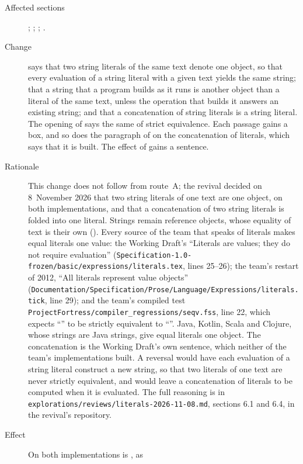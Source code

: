 \begin{description}
\item[Affected sections] ; ;
; .
\item[Change]  says that two string literals of the same text
denote one object, so that every evaluation of a string literal with a given
text yields the same string; that a string that a program builds as it runs is
another object than a literal of the same text, unless the operation that builds
it answers an existing string; and that a concatenation of string literals is a
string literal.
The opening of  says the same of strict equivalence.
Each passage gains a box, and so does the paragraph of  on
the concatenation of literals, which says that it is built.
The effect of  gains a sentence.
\item[Rationale] This change does not follow from route~A; the revival decided
on 8~November 2026 that two string literals of one text are one object, on both
implementations, and that a concatenation of two string literals is folded into
one literal.
Strings remain reference objects, whose equality of text is their own \EXP{=}
().
Every source of the team that speaks of literals makes equal literals one value:
the Working Draft's ``Literals are values; they do not require evaluation''
(\nolinkurl{Specification-1.0-frozen/basic/expressions/literals.tex}, lines
25--26); the team's restart of 2012, ``All literals represent value objects''
(\nolinkurl{Documentation/Specification/Prose/Language/Expressions/literals.tick},
line 29); and the team's compiled test
\nolinkurl{ProjectFortress/compiler_regressions/seqv.fss}, line 22, which
expects \hbox{\rm``''} to be strictly equivalent to
\hbox{\rm``''}.
Java, Kotlin, Scala and Clojure, whose strings are Java strings, give equal
literals one object.
The concatenation is the Working Draft's own sentence, which neither of the
team's implementations built.
A reversal would have each evaluation of a string literal construct a new
string, so that two literals of one text are never strictly equivalent, and
would leave a concatenation of literals to be computed when it is evaluated.
The full reasoning is in \nolinkurl{explorations/reviews/literals-2026-11-08.md},
sections 6.1 and 6.4, in the revival's repository.
\item[Effect] On both implementations
 is , as

\end{description}
